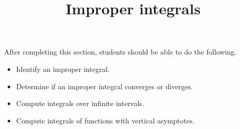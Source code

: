 \documentclass{ximera}
\title{Improper integrals}
\begin{document}
\begin{abstract}
\end{abstract}

\maketitle

\begin{sectionOutcomes}

After completing this section, students should be able to do the following.

\begin{itemize}
\item Identify an improper integral.
\item Determine if an improper integral converges or diverges.
\item Compute integrals over infinite intervals.
\item Compute integrals of functions with vertical asymptotes.
\end{itemize}

\end{sectionOutcomes}
\end{document}
